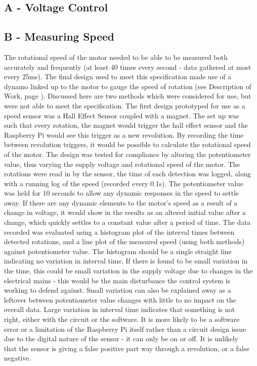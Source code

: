 \documentclass[twoside,a4]{report}
\def\br{\newline \newline \noindent}
\def\rpi{Raspberry Pi }
\begin{document}
\subsection*{A - Voltage Control}
\subsection*{B - Measuring Speed}
The rotational speed of the motor needed to be able to be measured both accurately and frequently (at least 40 times every second - data gathered at most every 25ms). The final design used to meet this specification made use of a dynamo linked up to the motor to gauge the speed of rotation (see Description of Work, page \pageref{chap:dow}). Discussed here are two methods which were considered for use, but were not able to meet the specification.\br 
The first design prototyped for use as a speed sensor was a Hall Effect Sensor coupled with a magnet. The set up was such that every rotation, the magnet would trigger the hall effect sensor and the \rpi would see this trigger as a new revolution. By recording the time between revolution triggers, it would be possible to calculate the rotational speed of the motor. The design was tested for compliance by altering the potentiometer value, thus varying the supply voltage and rotational speed of the motor. The rotations were read in by the sensor, the time of each detection was logged, along with a running log of the speed (recorded every 0.1s). The potentiometer value was held for 10 seconds to allow any dynamic responses in the speed to settle away. If there are any dynamic elements to the motor's speed as a result of a change in voltage, it would show in the results as an altered initial value after a change, which quickly settles to a constant value after  a period of time. The data recorded was evaluated using a histogram plot of the interval times between detected rotations, and a line plot of the measured speed (using both methods) against potentiometer value. \newline \newline \noindent
The histogram should be a single straight line indicating no variation in interval time. If there is found to be small variation in the time, this could be small variation in the supply voltage due to changes in the electrical mains - this would be the main disturbance the control system is working to defend against. Small variation can also be explained away as a leftover between potentiometer value changes with little to no impact on the overall data. Large variation in interval time indicates that something is not right, either with the circuit or the software. It is more likely to be a software error or a limitation of the Raspberry Pi itself rather than a circuit design issue due to the digital nature of the sensor - it can only be on or off. It is unlikely that the sensor is giving a false positive part way through a revolution, or a false negative. \newline \newline \noindent
\end{document}
